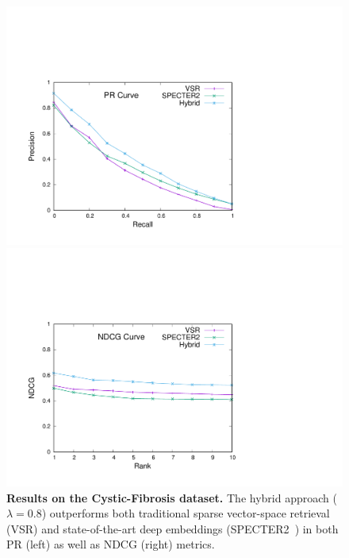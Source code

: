 \documentclass[
]{ceurart}
\begin{document}
\begin{figure}
  \centering
  \begin{minipage}{.48\linewidth}
    \centering
    \includegraphics[clip, trim=1.8cm 1.5cm 9cm 6cm, width=\linewidth]{figures/results.pdf}
  \end{minipage}%
  \hspace{0.4cm}
  \begin{minipage}{.48\linewidth}
    \centering
    \includegraphics[clip, trim=1.8cm 1.5cm 9cm 6cm, width=\linewidth]{figures/results.ndcg.pdf}
  \end{minipage}
  \caption{\textbf{Results on the Cystic-Fibrosis dataset.} The hybrid approach ($\lambda=0.8$) outperforms both traditional sparse vector-space retrieval (VSR) and state-of-the-art deep embeddings (SPECTER2~\cite{singh2023scirepeval}) in both PR (left) as well as NDCG (right) metrics.}
  \label{fig:results_main}
\end{figure}
\end{document}
